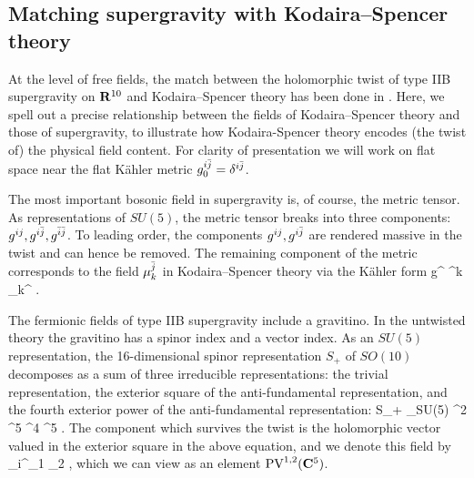 \documentclass[../main.tex]{subfiles}
\begin{document}
\subsection{Matching supergravity with Kodaira--Spencer theory}\label{s:components}

At the level of free fields, the match between the holomorphic twist of type IIB supergravity on $\mathbf{R}^{10}$ and Kodaira--Spencer theory has been done in \cite{SWspinor}.
Here, we spell out a precise relationship between the fields of Kodaira--Spencer theory and those of supergravity, to illustrate how Kodaira-Spencer theory encodes (the twist of) the physical field content.
For clarity of presentation we will work on flat space near the flat K\"ahler metric $g^{i {\Bar{j}}}_0 = \delta^{i {\Bar{j}}}$.


The most important bosonic field in supergravity is, of course, the metric tensor. 
As representations of $SU(5)$, the metric tensor breaks into three components: $g^{ij}, g^{i {\Bar{j}}}, g^{{\Bar{i}} {\Bar{j}}}$.
To leading order, the components $g^{ij}, g^{i {\Bar{j}}}$ are rendered massive in the twist and can hence be removed.
The remaining component of the metric corresponds to the field $\mu_{k}^{{\Bar{j}}}$ in Kodaira--Spencer theory via the K\"ahler form
\beqn
g^{\ibar \jbar} \mapsto \delta^{k \ibar} \mu_k^{\jbar} .
\eeqn

The fermionic fields of type IIB supergravity include a gravitino.
In the untwisted theory the gravitino has a spinor index and a vector index.
As an $SU(5)$ representation, the 16-dimensional spinor representation $S_+$ of $SO(10)$ decomposes as a sum of three irreducible representations: the trivial representation, the exterior square of the anti-fundamental representation, and the fourth exterior power of the anti-fundamental representation:
\beqn
S_+ \simeq_{SU(5)} \C \oplus \wedge^2 \br \C^5 \oplus \wedge^4 \br \C^5 .
\eeqn
The component which survives the twist is the holomorphic vector valued in the exterior square in the above equation, and we denote this field by
\beqn
\lambda_{i}^{\jbar_1 \jbar_2} ,
\eeqn
which we can view as an element ${\rm PV}^{1,2} (\mathbf{C}^5)$.
\end{document}
